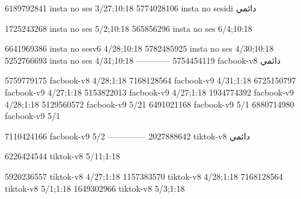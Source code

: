 
6189792841 insta no ses
3/27;10:18
5774028106 insta no sesidi
دائمي


1725243268 insta no ses
5/2;10:18
565856296 insta no ses
6/4;10:18

6641969386 insta no sesv6
4/28;10:18
5782485925 insta no ses
4/30;10:18
5252766693 insta no ses
4/31;10:18
------------
5754454119 facbook-v8
دائمي

5759779175 facbook-v8
4/28;1:18
7168128564 facbook-v9
4/31;1:18
6725150797 facbook-v9
4/27;1:18
5153822013 facbook-v9
4/27;1:18
1934774392 facbook-v9
4/28;1:18
5129560572 facbook-v9
5/21
6491021168 facbook-v9
5/1
6880714980 facbook-v9
5/1

7110424166 facbook-v9
5/2
--------------
2027888642 tiktok-v8
دائمي

6226424544 tiktok-v8
5/11;1:18

5920236557 tiktok-v8
4/27;1:18
1157383570 tiktok-v8
4/28;1:18
7168128564 tiktok-v8
5/1;1:18
1649302966 tiktok-v8
5/3;1:18
